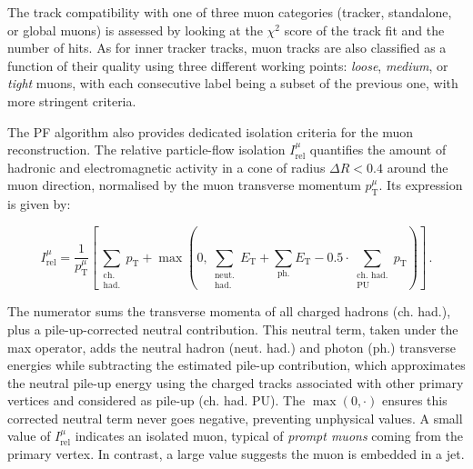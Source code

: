 The track compatibility with one of three muon categories (tracker, standalone, or global muons) is assessed by looking at the $\chi^2$ score of the track fit and the number of hits. As for inner tracker tracks, muon tracks are also classified as a function of their quality using three different working points: \textit{loose}, \textit{medium}, or \textit{tight} muons, with each consecutive label being a subset of the previous one, with more stringent criteria.

\vspace{0.5 cm}

The PF algorithm also provides dedicated isolation criteria for the muon reconstruction. The relative particle-flow isolation $I_{\textrm{rel}}^\mu$ quantifies the amount of hadronic and electromagnetic activity in a cone of radius $\Delta R<0.4$ around the muon direction, normalised by the muon transverse momentum $p_{\mathrm{T}}^\mu$. Its expression is given by:

\begin{equation}
    I_{\textrm{rel}}^\mu = \frac{1}{p_{\mathrm{T}}^\mu} \left[
        \sum\limits_{\substack{\textrm{ch.} \\ \textrm{had.}}} p_{\mathrm{T}} 
        + \max \left( 0 , 
            \sum\limits_{\substack{\textrm{neut.} \\ \textrm{had.}}} E_{\mathrm{T}} 
            + \sum\limits_{\textrm{ph.}} E_{\mathrm{T}} 
            - 
            0.5 \cdot \sum\limits_{\substack{\textrm{ch. had.} \\ \textrm{PU}}} p_{\mathrm{T}} 
        \right) \right]\, .
    \label{eq:PFisoMu}
\end{equation}

The numerator sums the transverse momenta of all charged hadrons (ch. had.), plus a pile-up-corrected neutral contribution. This neutral term, taken under the max operator, adds the neutral hadron (neut. had.) and photon (ph.) transverse energies while subtracting the estimated pile-up contribution, which approximates the neutral pile-up energy using the charged tracks associated with other primary vertices and considered as pile-up (ch. had. PU). The $\max(0,\cdot)$ ensures this corrected neutral term never goes negative, preventing unphysical values. A small value of $I_{\textrm{rel}}^\mu$ indicates an isolated muon, typical of \textit{prompt muons} coming from the primary vertex. In contrast, a large value suggests the muon is embedded in a jet.

